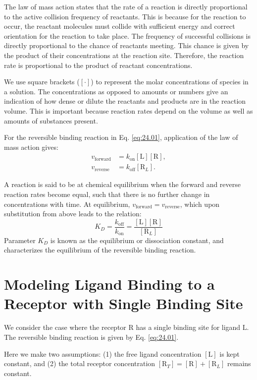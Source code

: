 The law of mass action states that the rate of a reaction is directly proportional to the active collision frequency of reactants. This is because for the reaction to occur, the reactant molecules must collide with sufficient energy and correct orientation for the reaction to take place. The frequency of successful collisions is directly proportional to the chance of reactants meeting. This chance is given by the product of their concentrations at the reaction site. Therefore, the reaction rate is proportional to the product of reactant concentrations.

We use square brackets ($[\cdot]$) to represent the molar concentrations of species in a solution. The concentrations as opposed to amounts or numbers give an indication of how dense or dilute the reactants and products are in the reaction volume. This is important because reaction rates depend on the volume as well as amounts of substances present.

For the reversible binding reaction in Eq. \ref{eq:24.01}, application of the law of mass action gives:
\begin{align}
	v_{\text{forward}} &= k_{\text{on}}[\text{L}][\text{R}], \\
	v_{\text{reverse}} &= k_{\text{off}}[\text{R}_L].
\label{eq:24.02}
\end{align}

A reaction is said to be at chemical equilibrium when the forward and reverse reaction rates become equal, such that there is no further change in concentrations with time. At equilibrium, $v_\text{forward}=v_\text{reverse}$, which upon substitution from above leads to the relation:
\begin{equation}
	K_D = \frac{k_{\text{off}}}{k_{\text{on}}} = \frac{[\text{L}][\text{R}]}{[\text{R}_L]}
\label{eq:24.03}
\end{equation}
Parameter $K_D$ is known as the equilibrium or dissociation constant, and characterizes the equilibrium of the reversible binding reaction.

\section{Modeling Ligand Binding to a Receptor with Single Binding Site}

We consider the case where the receptor $\text{R}$ has a single binding site for ligand $\text{L}$. The reversible binding reaction is given by Eq. \ref{eq:24.01}.

Here we make two assumptions: (1) the free ligand concentration $[\text{L}]$ is kept constant, and (2) the total receptor concentration $[\text{R}_T] = [\text{R}] + [\text{R}_L]$ remains constant.


